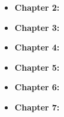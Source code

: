 \begin{itemize}

\item \textbf{Chapter 2: } 
 
\item \textbf{Chapter 3: }
 
\item \textbf{Chapter 4: } 
 
\item \textbf{Chapter 5: }  

\item \textbf{Chapter 6: }

\item \textbf{Chapter 7: } 


\end{itemize}









